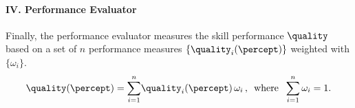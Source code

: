 \paragraph*{IV. Performance Evaluator}
Finally, the performance evaluator measures the skill performance $\quality$ based on a set of $n$ performance measures $\{\quality_i(\percept)\}$ weighted with $\{\omega_i\}$.
\begin{equation*}
    \quality(\percept)=\sum_{i=1}^{n} \!\quality_i(\percept) \, \omega_i \,, \,\,\,\text{where }\; \sum_{i=1}^{n} \omega_i = 1.
\end{equation*}